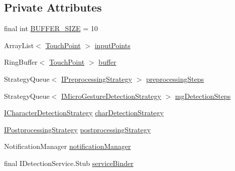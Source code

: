 \subsection*{Private Attributes}
\begin{DoxyCompactItemize}
\item 
final int \hyperlink{classch_1_1zhaw_1_1ba10__bsha__1_1_1service_1_1DetectionService_a9702db5e460b3123f4c475b05ed6942f}{BUFFER\_\-SIZE} = 10
\item 
ArrayList$<$ \hyperlink{classch_1_1zhaw_1_1ba10__bsha__1_1_1TouchPoint}{TouchPoint} $>$ \hyperlink{classch_1_1zhaw_1_1ba10__bsha__1_1_1service_1_1DetectionService_a6bf9d1f281b4bc5efb555b742f2ad928}{inputPoints}
\item 
RingBuffer$<$ \hyperlink{classch_1_1zhaw_1_1ba10__bsha__1_1_1TouchPoint}{TouchPoint} $>$ \hyperlink{classch_1_1zhaw_1_1ba10__bsha__1_1_1service_1_1DetectionService_a9188c843a530615bdd8c2e031879224b}{buffer}
\item 
StrategyQueue$<$ \hyperlink{interfacech_1_1zhaw_1_1ba10__bsha__1_1_1strategies_1_1IPreprocessingStrategy}{IPreprocessingStrategy} $>$ \hyperlink{classch_1_1zhaw_1_1ba10__bsha__1_1_1service_1_1DetectionService_a1cf989116feef3dca971827a4d16e56b}{preprocessingSteps}
\item 
StrategyQueue$<$ \hyperlink{interfacech_1_1zhaw_1_1ba10__bsha__1_1_1strategies_1_1IMicroGestureDetectionStrategy}{IMicroGestureDetectionStrategy} $>$ \hyperlink{classch_1_1zhaw_1_1ba10__bsha__1_1_1service_1_1DetectionService_ace6fc1c597f8789a6f7f8048296799a3}{mgDetectionSteps}
\item 
\hyperlink{interfacech_1_1zhaw_1_1ba10__bsha__1_1_1strategies_1_1ICharacterDetectionStrategy}{ICharacterDetectionStrategy} \hyperlink{classch_1_1zhaw_1_1ba10__bsha__1_1_1service_1_1DetectionService_a27bece13d8cc4a8d488f104d078acfeb}{charDetectionStrategy}
\item 
\hyperlink{interfacech_1_1zhaw_1_1ba10__bsha__1_1_1strategies_1_1IPostprocessingStrategy}{IPostprocessingStrategy} \hyperlink{classch_1_1zhaw_1_1ba10__bsha__1_1_1service_1_1DetectionService_addd3104ced0625818552e1c6459269ec}{postprocessingStrategy}
\item 
NotificationManager \hyperlink{classch_1_1zhaw_1_1ba10__bsha__1_1_1service_1_1DetectionService_a805b20b9685b173065d4bbceeb3a73d3}{notificationManager}
\item 
final IDetectionService.Stub \hyperlink{classch_1_1zhaw_1_1ba10__bsha__1_1_1service_1_1DetectionService_a9f24365c090a9ae586420e140fc97e0e}{serviceBinder}
\end{DoxyCompactItemize}
